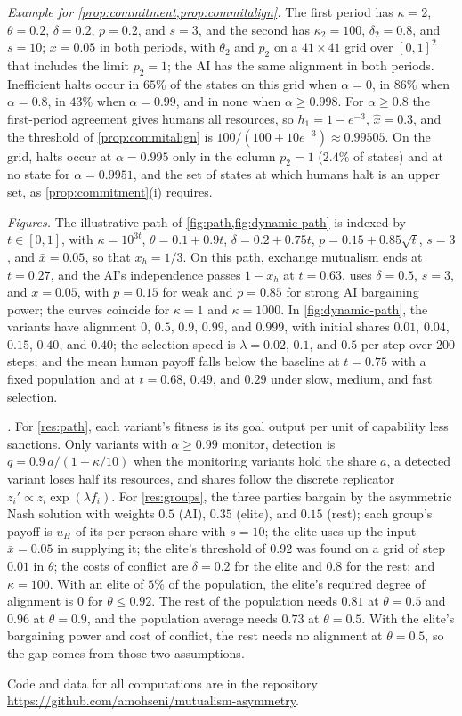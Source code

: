 \documentclass[article, 11pt, reqno]{amsart}
\theoremstyle{named}
\theoremstyle{plain}
\begin{document}
\textit{Example for \cref{prop:commitment,prop:commitalign}.} The first period has $\kappa = 2$, $\theta = 0.2$, $\delta = 0.2$, $p = 0.2$, and $s = 3$, and the second has $\kappa_2 = 100$, $\delta_2 = 0.8$, and $s = 10$; $\bar{x} = 0.05$ in both periods, with $\theta_2$ and $p_2$ on a $41 \times 41$ grid over $[0,1]^2$ that includes the limit $p_2 = 1$; the AI has the same alignment in both periods. Inefficient halts occur in $65\%$ of the states on this grid when $\alpha = 0$, in $86\%$ when $\alpha = 0.8$, in $43\%$ when $\alpha = 0.99$, and in none when $\alpha \ge 0.998$. For $\alpha \ge 0.8$ the first-period agreement gives humans all resources, so $h_1 = 1 - e^{-3}$, $\hat x = 0.3$, and the threshold of \cref{prop:commitalign} is $100/(100 + 10e^{-3}) \approx 0.99505$. On the grid, halts occur at $\alpha = 0.995$ only in the column $p_2 = 1$ ($2.4\%$ of states) and at no state for $\alpha = 0.9951$, and the set of states at which humans halt is an upper set, as \cref{prop:commitment}(i) requires.

\textit{Figures.} The illustrative path of \cref{fig:path,fig:dynamic-path} is indexed by $t \in [0,1]$, with $\kappa = 10^{3t}$, $\theta = 0.1 + 0.9t$, $\delta = 0.2 + 0.75t$, $p = 0.15 + 0.85\sqrt{t}$, $s = 3$, and $\bar{x} = 0.05$, so that $x_h = 1/3$. On this path, exchange mutualism ends at $t = 0.27$, and the AI's independence passes $1 - x_h$ at $t = 0.63$.  uses $\delta = 0.5$, $s = 3$, and $\bar{x} = 0.05$, with $p = 0.15$ for weak and $p = 0.85$ for strong AI bargaining power; the curves coincide for $\kappa = 1$ and $\kappa = 1000$. In \cref{fig:dynamic-path}, the variants have alignment $0$, $0.5$, $0.9$, $0.99$, and $0.999$, with initial shares $0.01$, $0.04$, $0.15$, $0.40$, and $0.40$; the selection speed is $\lambda = 0.02$, $0.1$, and $0.5$ per step over 200 steps; and the mean human payoff falls below the baseline at $t = 0.75$ with a fixed population and at $t = 0.68$, $0.49$, and $0.29$ under slow, medium, and fast selection.

\textit{.} For \cref{res:path}, each variant's fitness is its goal output per unit of capability less sanctions. Only variants with $\alpha \ge 0.99$ monitor, detection is $q = 0.9\,a/(1 + \kappa/10)$ when the monitoring variants hold the share $a$, a detected variant loses half its resources, and shares follow the discrete replicator $z_i' \propto z_i \exp(\lambda f_i)$. For \cref{res:groups}, the three parties bargain by the asymmetric Nash solution with weights $0.5$ (AI), $0.35$ (elite), and $0.15$ (rest); each group's payoff is $u_H$ of its per-person share with $s = 10$; the elite uses up the input $\bar{x} = 0.05$ in supplying it; the elite's threshold of $0.92$ was found on a grid of step $0.01$ in $\theta$; the costs of conflict are $\delta = 0.2$ for the elite and $0.8$ for the rest; and $\kappa = 100$. With an elite of $5\%$ of the population, the elite's required degree of alignment is $0$ for $\theta \le 0.92$. The rest of the population needs $0.81$ at $\theta = 0.5$ and $0.96$ at $\theta = 0.9$, and the population average needs $0.73$ at $\theta = 0.5$. With the elite's bargaining power and cost of conflict, the rest needs no alignment at $\theta = 0.5$, so the gap comes from those two assumptions.

Code and data for all computations are in the repository\\ \url{https://github.com/amohseni/mutualism-asymmetry}.
\end{document}
